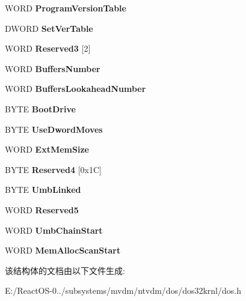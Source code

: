 \begin{DoxyCompactItemize}
W\+O\+RD {\bfseries Program\+Version\+Table}
\item 
\mbox{\label{struct___d_o_s___s_y_s_v_a_r_s_aa5d7a9af8ae3d25e458caabdc470ce93}} 
D\+W\+O\+RD {\bfseries Set\+Ver\+Table}
\item 
\mbox{\label{struct___d_o_s___s_y_s_v_a_r_s_a0bbcb5b6e3d555a522d6ad99d9360c81}} 
W\+O\+RD {\bfseries Reserved3} \mbox{[}2\mbox{]}
\item 
\mbox{\label{struct___d_o_s___s_y_s_v_a_r_s_aa58f253d553bc4890825dda3b427e14a}} 
W\+O\+RD {\bfseries Buffers\+Number}
\item 
\mbox{\label{struct___d_o_s___s_y_s_v_a_r_s_aa3b877104e28a4c4fc0454c39dfed661}} 
W\+O\+RD {\bfseries Buffers\+Lookahead\+Number}
\item 
\mbox{\label{struct___d_o_s___s_y_s_v_a_r_s_acfb6b07d07c99b9725888e01cd5b3d70}} 
B\+Y\+TE {\bfseries Boot\+Drive}
\item 
\mbox{\label{struct___d_o_s___s_y_s_v_a_r_s_a1b5c973a63b2ff5c006d65d1f20f2abf}} 
B\+Y\+TE {\bfseries Use\+Dword\+Moves}
\item 
\mbox{\label{struct___d_o_s___s_y_s_v_a_r_s_ac26e074e8eab199d446bb43115ffcfb8}} 
W\+O\+RD {\bfseries Ext\+Mem\+Size}
\item 
\mbox{\label{struct___d_o_s___s_y_s_v_a_r_s_a5970d3a5fc3439e2c4bc09138fd29231}} 
B\+Y\+TE {\bfseries Reserved4} \mbox{[}0x1\+C\mbox{]}
\item 
\mbox{\label{struct___d_o_s___s_y_s_v_a_r_s_ae9e160678ce5ede250df68dcdb166cd6}} 
B\+Y\+TE {\bfseries Umb\+Linked}
\item 
\mbox{\label{struct___d_o_s___s_y_s_v_a_r_s_a216e93cd57bb79edabf8300f7e6f9a6b}} 
W\+O\+RD {\bfseries Reserved5}
\item 
\mbox{\label{struct___d_o_s___s_y_s_v_a_r_s_a90a99ef713340a3354dee27d0527b1be}} 
W\+O\+RD {\bfseries Umb\+Chain\+Start}
\item 
\mbox{\label{struct___d_o_s___s_y_s_v_a_r_s_a250df0fb4c763ff145cfc8802432d338}} 
W\+O\+RD {\bfseries Mem\+Alloc\+Scan\+Start}
\end{DoxyCompactItemize}


该结构体的文档由以下文件生成\+:\begin{DoxyCompactItemize}
\item 
E\+:/\+React\+O\+S-\/0../subsystems/mvdm/ntvdm/dos/dos32krnl/dos.\+h\end{DoxyCompactItemize}
